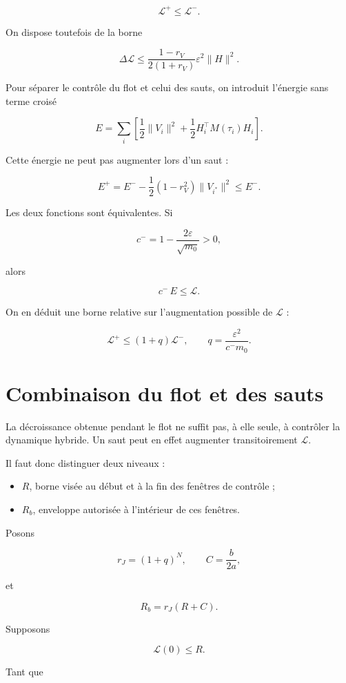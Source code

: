 \[
\mathcal L^+\leq\mathcal L^-.
\]

On dispose toutefois de la borne

\[
\Delta\mathcal L
\leq
\frac{1-r_V}{2(1+r_V)}
\varepsilon^2\|H\|^2.
\]

Pour séparer le contrôle du flot et celui des sauts, on introduit l'énergie sans terme croisé

\[
E
=
\sum_i
\left[
\frac12\|V_i\|^2
+
\frac12H_i^\top M(\tau_i)H_i
\right].
\]

Cette énergie ne peut pas augmenter lors d'un saut :

\[
E^+
=
E^-
-
\frac12(1-r_V^2)
\|V_{i^\ast}\|^2
\leq E^-.
\]

Les deux fonctions sont équivalentes. Si

\[
c^{-}=
1-\frac{2\varepsilon}{\sqrt{m_0}}>0,
\]

alors

\[
c^{-}\,E\leq\mathcal L.
\]

On en déduit une borne relative sur l'augmentation possible de
\(\mathcal L\) :

\[
\mathcal L^+
\leq
(1+q)\mathcal L^-,
\qquad
q=
\frac{\varepsilon^2}{c^{-}m_0}.
\]

\section{Combinaison du flot et des sauts}
\label{t1-combinaison-du-flot-et-des-sauts}

La décroissance obtenue pendant le flot ne suffit pas, à elle seule,
à contrôler la dynamique hybride. Un saut peut en effet augmenter
transitoirement \(\mathcal L\).

Il faut donc distinguer deux niveaux :

\begin{itemize}
\tightlist
\item
  \(R\), borne visée au début et à la fin des fenêtres de contrôle ;
\item
  \(R_b\), enveloppe autorisée à l'intérieur de ces fenêtres.
\end{itemize}

Posons

\[
r_J=(1+q)^N,
\qquad
C=\frac{b}{2a},
\]

et

\[
R_b=r_J(R+C).
\]

Supposons

\[
\mathcal L(0)\leq R.
\]

Tant que


